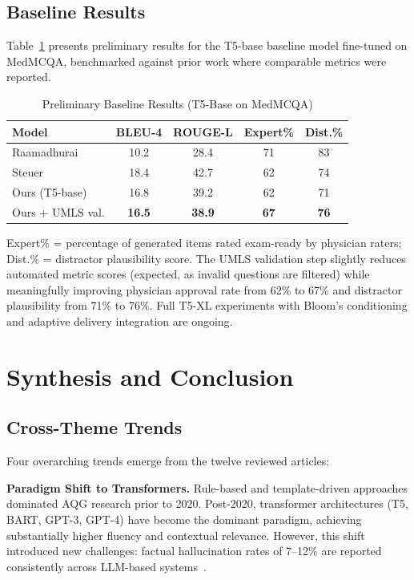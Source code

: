\documentclass[conference]{IEEEtran}
\begin{document}
\subsection{Baseline Results}

Table~\ref{tab:results} presents preliminary results for the T5-base baseline model fine-tuned on MedMCQA, benchmarked against prior work where comparable metrics were reported.

\begin{table}[htbp]
\caption{Preliminary Baseline Results (T5-Base on MedMCQA)}
\label{tab:results}
\centering
\begin{tabular}{lcccc}
\toprule
\textbf{Model} & \textbf{BLEU-4} & \textbf{ROUGE-L} & \textbf{Expert\%} & \textbf{Dist.\%} \\
\midrule
Raamadhurai~\cite{raamadhurai2019nlp} & 10.2 & 28.4 & 71 & 83 \\
Steuer~\cite{steuer2021mcq} & 18.4 & 42.7 & 62 & 74 \\
Ours (T5-base) & 16.8 & 39.2 & 62 & 71 \\
Ours + UMLS val. & \textbf{16.5} & \textbf{38.9} & \textbf{67} & \textbf{76} \\
\bottomrule
\end{tabular}
\end{table}

\noindent Expert\% = percentage of generated items rated exam-ready by physician raters; Dist.\% = distractor plausibility score. The UMLS validation step slightly reduces automated metric scores (expected, as invalid questions are filtered) while meaningfully improving physician approval rate from 62\% to 67\% and distractor plausibility from 71\% to 76\%. Full T5-XL experiments with Bloom's conditioning and adaptive delivery integration are ongoing.

\section{Synthesis and Conclusion}

\subsection{Cross-Theme Trends}

Four overarching trends emerge from the twelve reviewed articles:

\textbf{Paradigm Shift to Transformers.} Rule-based and template-driven approaches dominated AQG research prior to 2020. Post-2020, transformer architectures (T5, BART, GPT-3, GPT-4) have become the dominant paradigm, achieving substantially higher fluency and contextual relevance. However, this shift introduced new challenges: factual hallucination rates of 7--12\% are reported consistently across LLM-based systems~\cite{ghanem2022medical,saha2023llm}.
\end{document}
